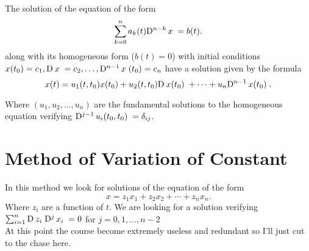 The solution of the equation of the form
\[
	\sum_{k=0}^n a_k(t) \D[n-k]{x} = b(t)
	.\]
along with its homogeneous form ($b(t)=0$) with initial conditions $x(t_0)=c_1,\D{x}=c_2,\ldots,\D[n-1]{x}(t_0)=c_n$ have a solution given by the formula
\[
	x(t) = u_1(t,t_0)x(t_0) + u_2(t,t_0) \D{x(t_0)}+\cdots+u_n\D[n-1]{x(t_0)}
	.\]

Where $(u_1,u_2,\ldots,u_n)$ are the fundamental solutions to the homogeneous equation verifying $\D[j-1]{u_i(t_0,t_0)}=\delta_{ij}$.



\section{Method of Variation of Constant}
In this method we look for solutions of the equation of the form
\[
	x = z_1x_1 + z_2x_2 + \cdots + z_nx_n
	.\]
Where $z_i$ are a function of $t$. We are looking for a solution verifying $\sum_{i=1}^n \D{z_i}\D[j]{x_i}=0$ for $j = 0,1,\ldots,n-2$\\

At this point the course become extremely useless and redundant so I'll just cut to the chase here.
\section{}
